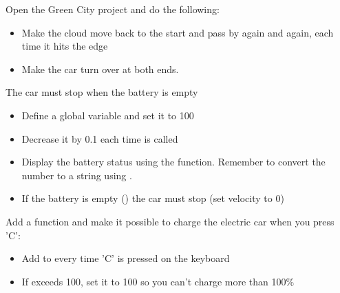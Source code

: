 %
\begin{exercisebox}[adjusted title=More exercises about conditions]
Open the Green City project and do the following:
\begin{itemize}
\item Make the cloud move back to the start and pass by again and
 again, each time it hits the edge
\item Make the car turn over at both ends.
\end{itemize}
The car must stop when the battery is empty
 \begin{itemize}
 \item Define a global variable  and set it to 100
 \item Decrease it by 0.1 each time  is called
 \item Display the battery status using the  function.
 Remember to convert the number to a string using .
 \item If the battery is empty () the car must stop (set velocity to 0)
 \end{itemize}
Add a  function and make it possible to charge the electric car when you press 'C':
 \begin{itemize}
 \item Add  to  every time 'C' is pressed on the keyboard
 \item If  exceeds 100, set it to 100 so you can't charge more than 100\%
 \end{itemize}
\end{exercisebox}



